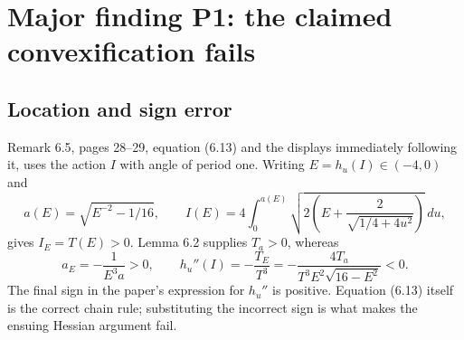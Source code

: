 \documentclass[10pt]{article}
\begin{document}
\section*{Major finding P1: the claimed convexification fails}
\subsection*{Location and sign error}
Remark 6.5, pages 28–29, equation (6.13) and the displays immediately following it, uses the action \(I\) with angle of period one. Writing \(E=h_u(I)\in(-4,0)\) and \[a(E)=\sqrt{E^{-2}-1/16},\qquad
 I(E)=4\int_0^{a(E)}
       \sqrt{2\left(E+\frac{2}{\sqrt{1/4+4u^2}}\right)}\,du ,\] gives \(I_E=T(E)>0\). Lemma 6.2 supplies \(T_a>0\), whereas \[a_E=-\frac{1}{E^3a}>0,\qquad
 h_u''(I)=-\frac{T_E}{T^3}
        =-\frac{4T_a}{T^3E^2\sqrt{16-E^2}}<0.\] The final sign in the paper’s expression for \(h_u''\) is positive. Equation (6.13) itself is the correct chain rule; substituting the incorrect sign is what makes the ensuing Hessian argument fail.\par
\end{document}
